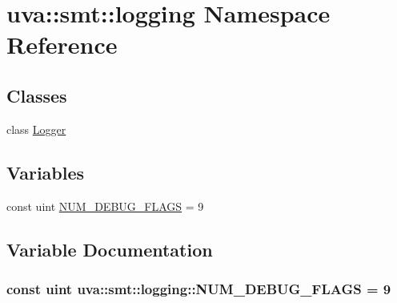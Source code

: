 \hypertarget{namespaceuva_1_1smt_1_1logging}{}\section{uva\+:\+:smt\+:\+:logging Namespace Reference}
\label{namespaceuva_1_1smt_1_1logging}
\subsection*{Classes}
\begin{DoxyCompactItemize}
\item 
class \hyperlink{classuva_1_1smt_1_1logging_1_1_logger}{Logger}
\end{DoxyCompactItemize}
\subsection*{Variables}
\begin{DoxyCompactItemize}
\item 
const uint \hyperlink{namespaceuva_1_1smt_1_1logging_a0aef8b9433fb2c5b025fd3bd5c713dae}{N\+U\+M\+\_\+\+D\+E\+B\+U\+G\+\_\+\+F\+L\+A\+G\+S} = 9
\end{DoxyCompactItemize}


\subsection{Variable Documentation}
\hypertarget{namespaceuva_1_1smt_1_1logging_a0aef8b9433fb2c5b025fd3bd5c713dae}{}
\subsubsection[{N\+U\+M\+\_\+\+D\+E\+B\+U\+G\+\_\+\+F\+L\+A\+G\+S}]{\setlength{\rightskip}{0pt plus 5cm}const uint uva\+::smt\+::logging\+::\+N\+U\+M\+\_\+\+D\+E\+B\+U\+G\+\_\+\+F\+L\+A\+G\+S = 9}\label{namespaceuva_1_1smt_1_1logging_a0aef8b9433fb2c5b025fd3bd5c713dae}
